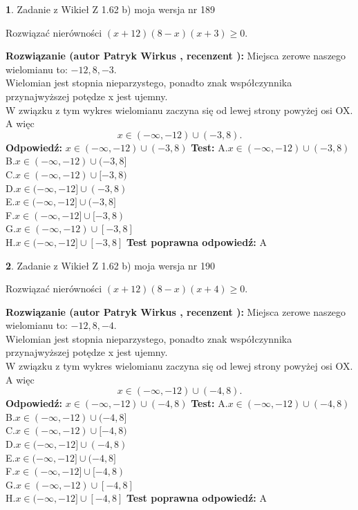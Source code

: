 \documentclass[12pt, a4paper]{article}
\theoremstyle{definition} %
\newtheorem{zad}{}
\newcommand{\zadStart}[1]{\begin{zad}#1\newline}
\newcommand{\zadStop}{\end{zad}}
\newcommand{\rozwStart}[2]{\noindent \textbf{Rozwiązanie (autor #1 , recenzent #2): }\newline}
\newcommand{\rozwStop}{\newline}
\newcommand{\odpStart}{\noindent \textbf{Odpowiedź:}\newline}
\newcommand{\odpStop}{\newline}
\newcommand{\testStart}{\noindent \textbf{Test:}\newline}
\newcommand{\testStop}{\newline}
\newcommand{\kluczStart}{\noindent \textbf{Test poprawna odpowiedź:}\newline}
\newcommand{\kluczStop}{\newline}
\begin{document}
\zadStart{Zadanie z Wikieł Z 1.62 b) moja wersja nr 189}

Rozwiązać nierówności $(x+12)(8-x)(x+3)\ge0$.
\zadStop
\rozwStart{Patryk Wirkus}{}
Miejsca zerowe naszego wielomianu to: $-12, 8, -3$.\\
Wielomian jest stopnia nieparzystego, ponadto znak współczynnika przy\linebreak najwyższej potędze x jest ujemny.\\ W związku z tym wykres wielomianu zaczyna się od lewej strony powyżej osi OX. A więc $$x \in (-\infty,-12) \cup (-3,8).$$
\rozwStop
\odpStart
$x \in (-\infty,-12) \cup (-3,8)$
\odpStop
\testStart
A.$x \in (-\infty,-12) \cup (-3,8)$\\
B.$x \in (-\infty,-12) \cup (-3,8]$\\
C.$x \in (-\infty,-12) \cup [-3,8)$\\
D.$x \in (-\infty,-12] \cup (-3,8)$\\
E.$x \in (-\infty,-12] \cup (-3,8]$\\
F.$x \in (-\infty,-12] \cup [-3,8)$\\
G.$x \in (-\infty,-12) \cup [-3,8]$\\
H.$x \in (-\infty,-12] \cup [-3,8]$
\testStop
\kluczStart
A
\kluczStop



\zadStart{Zadanie z Wikieł Z 1.62 b) moja wersja nr 190}

Rozwiązać nierówności $(x+12)(8-x)(x+4)\ge0$.
\zadStop
\rozwStart{Patryk Wirkus}{}
Miejsca zerowe naszego wielomianu to: $-12, 8, -4$.\\
Wielomian jest stopnia nieparzystego, ponadto znak współczynnika przy\linebreak najwyższej potędze x jest ujemny.\\ W związku z tym wykres wielomianu zaczyna się od lewej strony powyżej osi OX. A więc $$x \in (-\infty,-12) \cup (-4,8).$$
\rozwStop
\odpStart
$x \in (-\infty,-12) \cup (-4,8)$
\odpStop
\testStart
A.$x \in (-\infty,-12) \cup (-4,8)$\\
B.$x \in (-\infty,-12) \cup (-4,8]$\\
C.$x \in (-\infty,-12) \cup [-4,8)$\\
D.$x \in (-\infty,-12] \cup (-4,8)$\\
E.$x \in (-\infty,-12] \cup (-4,8]$\\
F.$x \in (-\infty,-12] \cup [-4,8)$\\
G.$x \in (-\infty,-12) \cup [-4,8]$\\
H.$x \in (-\infty,-12] \cup [-4,8]$
\testStop
\kluczStart
A
\kluczStop
\end{document}
